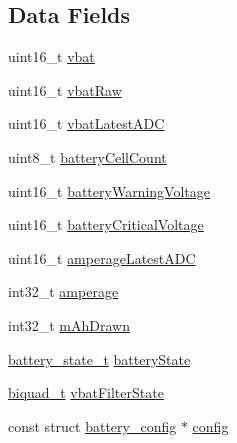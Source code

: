 \subsection*{Data Fields}
\begin{DoxyCompactItemize}
\item 
uint16\+\_\+t \hyperlink{structbattery_a1329cbf7c141215e4fd76a3ffeee11fa}{vbat}
\item 
uint16\+\_\+t \hyperlink{structbattery_a02d5b3fa6e42d5a6694e491f39ca27ef}{vbat\+Raw}
\item 
uint16\+\_\+t \hyperlink{structbattery_acca528850e1ebab84e8c4fcd584220e2}{vbat\+Latest\+A\+D\+C}
\item 
uint8\+\_\+t \hyperlink{structbattery_abcfd05fa6169eb831a83b48645db55ef}{battery\+Cell\+Count}
\item 
uint16\+\_\+t \hyperlink{structbattery_aedec5158d7a0523054636689274910b9}{battery\+Warning\+Voltage}
\item 
uint16\+\_\+t \hyperlink{structbattery_a043a48525048254907b283ae22e189a2}{battery\+Critical\+Voltage}
\item 
uint16\+\_\+t \hyperlink{structbattery_a9d47c19d6c15d9c95a0149dbb811daa6}{amperage\+Latest\+A\+D\+C}
\item 
int32\+\_\+t \hyperlink{structbattery_a1bc76d30de02dab8edd0e9b57ae3c82d}{amperage}
\item 
int32\+\_\+t \hyperlink{structbattery_a93d3ba79bde0e5c7c211cb4af0061e57}{m\+Ah\+Drawn}
\item 
\hyperlink{sensors_2battery_8h_a22b38b26763aa629baa29efb37a4e993}{battery\+\_\+state\+\_\+t} \hyperlink{structbattery_a77bcb24cd987fedec154e1a26c35bb20}{battery\+State}
\item 
\hyperlink{filter_8h_a7256a3fa62e7894f819ddd905006ad2e}{biquad\+\_\+t} \hyperlink{structbattery_a0873d5ad97e104cc43ccf541739cf5d4}{vbat\+Filter\+State}
\item 
const struct \hyperlink{structbattery__config}{battery\+\_\+config} $\ast$ \hyperlink{structbattery_a486ceaa6f6c4e58cf32601f45581d84b}{config}
\end{DoxyCompactItemize}


